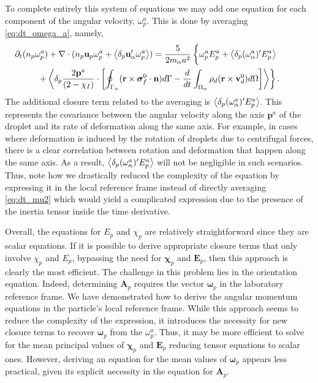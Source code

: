 To complete entirely this system of equations we may add one equation for each component of the angular velocity, $\omega_p^a$. 
This is done by averaging \ref{eq:dt_omega_a}, namely,
\begin{multline}
    \pddt (n_p \omega^a_p)
    + \div (
        n_p \textbf{u}_p \omega^a_p 
        + \pavg{\textbf{u}_\alpha' \omega^a_p}
    )
    = 
    \frac{5}{2 m_\alpha a^2}\left\{
        \omega^a_p E^a_p + \pavg{(\omega^a_\alpha)' E^a_p} \phantom{\intS{}} \right. \\ \left.
        +\pavg{
        \frac{2 \textbf{p}^a}{ (2 - \chi_I)}\cdot 
        \left[\intS{(\textbf{r}\times\bm\sigma_f^0\cdot \textbf{n})} 
        - \ddt\intO{\rho_d(\textbf{r}\times \textbf{v}_d^0)}\right]
        }
    \right\}. 
\end{multline}
The additional closure term related to the averaging is $\left<\delta_p (\omega^a_\alpha)' E^a_p\right>$.
This represents the covariance between the angular velocity along the axis $\textbf{p}^a$ of the droplet and its rate of deformation along the same axis. 
For example, in cases where deformation is induced by the rotation of droplets due to centrifugal forces, there is a clear correlation between rotation and deformation that happen along the same axis. 
As a result, $\left<\delta_p (\omega^a_\alpha)' E^a_p\right>$ will not be negligible in such scenarios.
Thus, note how we drastically reduced the complexity of the equation by expressing it in the local reference frame instead of directly averaging \ref{eq:dt_mu2} which would yield a complicated expression due to the presence of the inertia tensor inside the time derivative.  

Overall, the equations for $E_p$ and $\chi_p$ are relatively straightforward since they are scalar equations. 
If it is possible to derive appropriate closure terms that only involve $\chi_p$ and $E_p$, bypassing the need for $\bm\chi_p$ and $\textbf{E}_p$, then this approach is clearly the most efficient. 
The challenge in this problem lies in the orientation equation.
Indeed, determining $\textbf{A}_p$ requires the vector $\bm\omega_p$ in the laboratory reference frame.
We have demonstrated how to derive the angular momentum equations in the particle's local reference frame. 
While this approach seems to reduce the complexity of the expression, it introduces the necessity for new closure terms to recover $\bm\omega_p$ from the $\omega^a_p$. 
Thus, it may be more efficient to solve for the mean principal values of $\bm\chi_p$ and $\textbf{E}_p$ reducing tensor equations to scalar ones.
However, deriving an equation for the mean values of $\bm\omega_p$ appears less practical, given its explicit necessity in the equation for $\textbf{A}_p$. 

